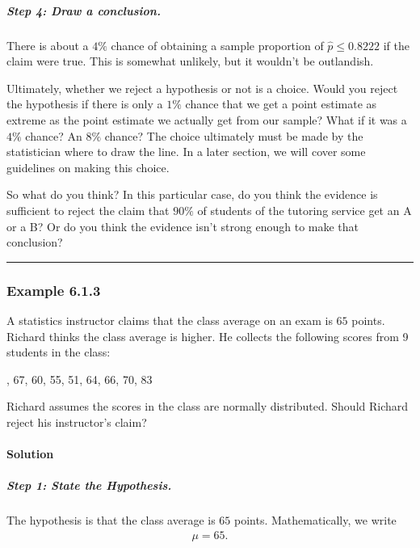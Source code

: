 \documentclass[letterpaper,10pt,english]{jupyterBook}
\begin{document}
\subparagraph{Step 4: Draw a conclusion.}
\label{\detokenize{Ch6 An Introduction to Hypothesis Testing/6.1 An Introduction to Hypothesis Testing:id5}}
\sphinxAtStartPar
There is about a \(4\%\) chance of obtaining a sample proportion of \(\hat{p} \leq 0.8222\) if the claim were true. This is somewhat unlikely, but it wouldn’t be outlandish.

\sphinxAtStartPar
Ultimately, whether we reject a hypothesis or not is a choice. Would you reject the hypothesis if there is only a \(1\%\) chance that we get a point estimate as extreme as the point estimate we actually get from our sample? What if it was a \(4\%\) chance? An \(8\%\) chance? The choice ultimately must be made by the statistician where to draw the line. In a later section, we will cover some guidelines on making this choice.

\sphinxAtStartPar
So what do you think? In this particular case, do you think the evidence is sufficient to reject the claim that \(90\%\) of students of the tutoring service get an A or a B? Or do you think the evidence isn’t strong enough to make that conclusion?


\bigskip\hrule\bigskip



\subsubsection{Example 6.1.3}
\label{\detokenize{Ch6 An Introduction to Hypothesis Testing/6.1 An Introduction to Hypothesis Testing:example-6-1-3}}
\sphinxAtStartPar
A statistics instructor claims that the class average on an exam is \(65\) points. Richard thinks the class average is higher. He collects the following scores from 9 students in the class:

, 67, 60, 55, 51, 64, 66, 70, 83

\sphinxAtStartPar
Richard assumes the scores in the class are normally distributed. Should Richard reject his instructor’s claim?


\paragraph{Solution}
\label{\detokenize{Ch6 An Introduction to Hypothesis Testing/6.1 An Introduction to Hypothesis Testing:id6}}

\subparagraph{Step 1: State the Hypothesis.}
\label{\detokenize{Ch6 An Introduction to Hypothesis Testing/6.1 An Introduction to Hypothesis Testing:id7}}
\sphinxAtStartPar
The hypothesis is that the class average is \(65\) points. Mathematically, we write
\begin{equation*}
\begin{split} \mu = 65. \end{split}
\end{equation*}
\end{document}
